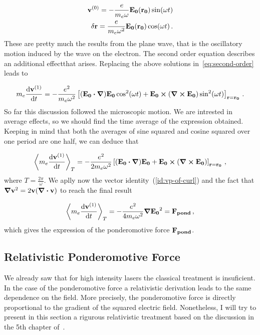 \documentclass[12pt, class=report, crop=false]{standalone}
\begin{document}
\begin{subequations}
  \begin{align}
    \vb{v}^{(0)} = - \frac{e}{m_e \omega} \vb{E_0}(\vb{r_0}) \sin(\omega t)\\
    \delta \vb{r} = \frac{e}{m_e \omega^2} \vb{E_0}(\vb{r_0}) \cos(\omega t)\,.
  \end{align}
\end{subequations}
These are pretty much the results from the plane wave, that is the oscillatory motion induced by the wave on the electron. The second order equation describes an additional effectthat arises. Replacing the above solutions in~\cref{eq:second-order} leads to

\begin{equation}
    m_e\dv{\vb{v}^{(1)}}{t} = - \frac{e^2}{m_e \omega^2} \left[ (\vb{E_0}\vdot\grad)\vb{E_0}\cos[2](\omega t) + \vb{E_0}\cp\left(\curl{\vb{E_0}}\right)\sin[2](\omega t) \right]_{\vb{r}=\vb{r_0}}\,.
\end{equation}
So far this discussion followed the microscopic motion. We are intrested in average effects, so we should find the time average of the expression obtained. Keeping in mind that both the averages of sine squared and cosine squared over one period are one half, we can deduce that

\begin{equation}
  \expval{m_e\dv{\vb{v}^{(1)}}{t}}_T =  - \frac{e^2}{2 m_e \omega^2} \left[ (\vb{E_0}\vdot\grad)\vb{E_0} + \vb{E_0}\cp\left(\curl{\vb{E_0}}\right)\right]_{\vb{r}=\vb{r_0}}\,,
\end{equation}
where \(T=\frac{2\pi}{\omega}\).
We aplly now the vector identity~(\ref{id:vp-of-curl}) and the fact that \(\grad{\vb{v}^2} = 2\vb{v}(\div{\vb{v}})\) to reach the final result

\begin{equation}
  \expval{m_e\dv{\vb{v}^{(1)}}{t}}_T = - \frac{e^2}{4 m_e \omega^2} \grad{\vb{E_0}^2} = \vb{F_{pond}}\,,
\end{equation}
which gives the expression of the ponderomotive force \(\vb{F_{pond}}\).

\subsection{Relativistic Ponderomotive Force}

We already saw that for high intensity lasers the classical treatment is insuficient. In the case of the ponderomotive force a relativistic derivation leads to the same dependence on the field. More precisely, the ponderomotive force is directly proportional to the gradient of the squared electric field. Nonetheless, I will try to present in this section a rigurous relativistic treatment based on the discussion in the 5th chapter of~\cite{mulserHighPowerLasermatter2010}.
\end{document}
